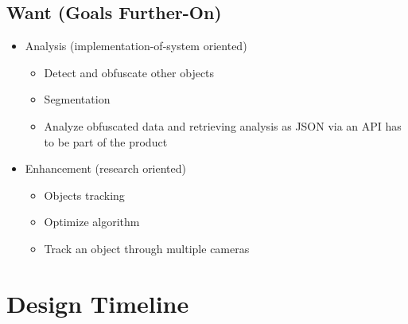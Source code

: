 \documentclass[onecolumn, draftclsnofoot,10pt, compsoc]{IEEEtran}
\begin{document}
\begin{varwidth}[t]{.5\textwidth}
\subsection{Want (Goals Further-On)}
\begin{itemize}
    \item Analysis (implementation-of-system oriented)
        \begin{itemize}
            \item Detect and obfuscate other objects
            \item Segmentation \cite{mask}
            \item Analyze obfuscated data and retrieving analysis as JSON via an API has to be part of the product
        \end{itemize}
    \item Enhancement (research oriented)
        \begin{itemize}
            \item Objects tracking \cite{kim}
            \item Optimize algorithm
            \item Track an object through multiple cameras \cite{multi}
        \end{itemize}
\end{itemize}
\end{varwidth}

\section{Design Timeline}
\end{document}
